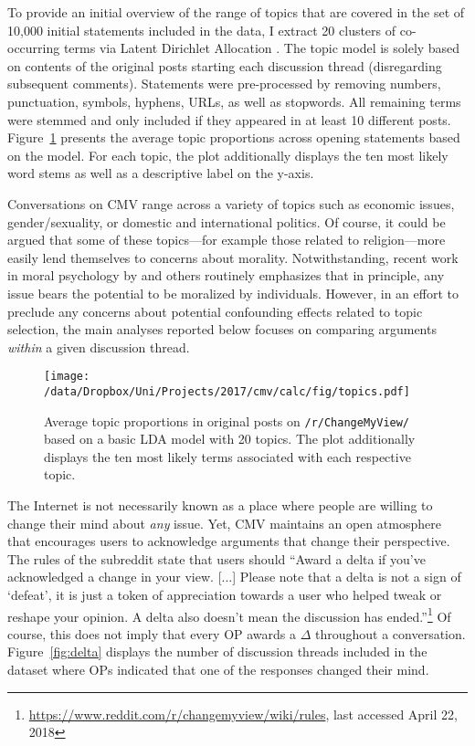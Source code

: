 To provide an initial overview of the range of topics that are covered in the set of 10,000 initial statements included in the data, I extract 20 clusters of co-occurring terms via Latent Dirichlet Allocation \citep{blei2003latent}. The topic model is solely based on contents of the original posts starting each discussion thread (disregarding subsequent comments). Statements were pre-processed by removing numbers, punctuation, symbols, hyphens, URLs, as well as stopwords. All remaining terms were stemmed and only included if they appeared in at least 10 different posts. Figure~\ref{fig:lda} presents the average topic proportions across opening statements based on the model. For each topic, the plot additionally displays the ten most likely word stems as well as a descriptive label on the y-axis.

Conversations on CMV range across a variety of topics such as economic issues, gender/sexuality, or domestic and international politics. Of course, it could be argued that some of these topics---for example those related to religion---more easily lend themselves to concerns about morality. Notwithstanding, recent work in moral psychology by \citet{ryan2014reconsidering} and others routinely emphasizes that in principle, any issue bears the potential to be moralized by individuals. However, in an effort to preclude any concerns about potential confounding effects related to topic selection, the main analyses reported below focuses on comparing arguments \textit{within} a given discussion thread.
\begin{figure}[ht]
\centering
\texttt{[image: /data/Dropbox/Uni/Projects/2017/cmv/calc/fig/topics.pdf]}
\caption[Average topic proportions in original posts on \texttt{/r/ChangeMyView/}]{Average topic proportions in original posts on \texttt{/r/ChangeMyView/} based on a basic LDA model with 20 topics. The plot additionally displays the ten most likely terms associated with each respective topic.}\label{fig:lda}
\end{figure}

The Internet is not necessarily known as a place where people are willing to change their mind about \textit{any} issue. Yet, CMV maintains an open atmosphere that encourages users to acknowledge arguments that change their perspective. The rules of the subreddit state that users should ``Award a delta if you've acknowledged a change in your view. [...] Please note that a delta is not a sign of `defeat', it is just a token of appreciation towards a user who helped tweak or reshape your opinion. A delta also doesn't mean the discussion has ended.''\footnote{ \url{https://www.reddit.com/r/changemyview/wiki/rules}, last accessed April 22, 2018} Of course, this does not imply that every OP awards a $\Delta$ throughout a conversation. Figure~\ref{fig:delta} displays the number of discussion threads included in the dataset where OPs indicated that one of the responses changed their mind.

